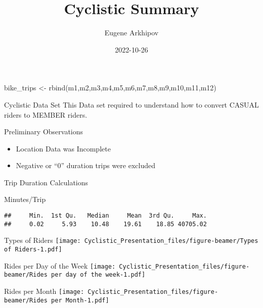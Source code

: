 \documentclass[
  ignorenonframetext,
]{beamer}
\title{Cyclistic Summary}
\author{Eugene Arkhipov}
\date{2022-10-26}
\newenvironment{Shaded}{\begin{snugshade}}{\end{snugshade}}
\newcommand{\FunctionTok}[1]{\textcolor[rgb]{0.00,0.00,0.00}{#1}}
\newcommand{\NormalTok}[1]{#1}
\newcommand{\OtherTok}[1]{\textcolor[rgb]{0.56,0.35,0.01}{#1}}
\providecommand{\tightlist}{%
  \setlength{\itemsep}{0pt}\setlength{\parskip}{0pt}}
\begin{document}
\frame{\titlepage}

\begin{frame}[fragile]
\begin{Shaded}
\begin{Highlighting}[]
\NormalTok{bike\_trips }\OtherTok{\textless{}{-}} \FunctionTok{rbind}\NormalTok{(m1,m2,m3,m4,m5,m6,m7,m8,m9,m10,m11,m12)}
\end{Highlighting}
\end{Shaded}
\end{frame}

\begin{frame}{Cyclistic Data Set}
\protect\hypertarget{cyclistic-data-set}{}
This Data set required to understand how to convert CASUAL riders to
MEMBER riders.
\end{frame}

\begin{frame}{Preliminary Observations}
\protect\hypertarget{preliminary-observations}{}
\begin{itemize}
\tightlist
\item
  Location Data was Incomplete
\item
  Negative or ``0'' duration trips were excluded
\end{itemize}
\end{frame}

\begin{frame}[fragile]{Trip Duration Calculations}
\protect\hypertarget{trip-duration-calculations}{}
\begin{block}{Minutes/Trip}
\protect\hypertarget{minutestrip}{}
\begin{verbatim}
##     Min.  1st Qu.   Median     Mean  3rd Qu.     Max. 
##     0.02     5.93    10.48    19.61    18.85 40705.02
\end{verbatim}
\end{block}
\end{frame}

\begin{frame}{Types of Riders}
\protect\hypertarget{types-of-riders}{}
\texttt{[image: Cyclistic\_Presentation\_files/figure-beamer/Types of Riders-1.pdf]}
\end{frame}

\begin{frame}{Rides per Day of the Week}
\protect\hypertarget{rides-per-day-of-the-week}{}
\texttt{[image: Cyclistic\_Presentation\_files/figure-beamer/Rides per day of the week-1.pdf]}
\end{frame}

\begin{frame}{Rides per Month}
\protect\hypertarget{rides-per-month}{}
\texttt{[image: Cyclistic\_Presentation\_files/figure-beamer/Rides per Month-1.pdf]}
\end{frame}
\end{document}
